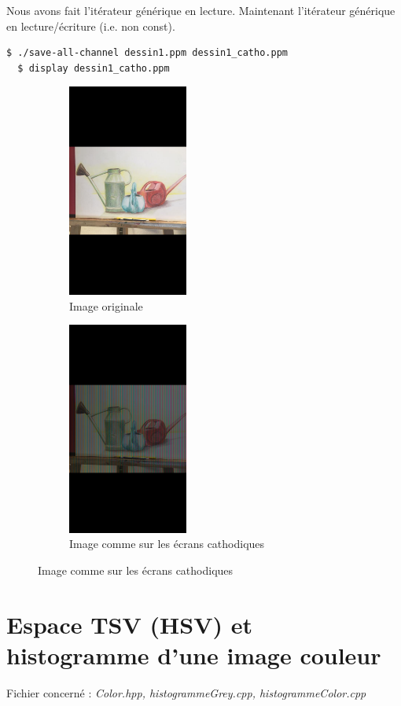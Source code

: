 \documentclass[a4paper,10pt]{article}
\begin{document}
    Nous avons fait l'itérateur générique en lecture. Maintenant l'itérateur générique en lecture/écriture (i.e. non const).
     \begin{lstlisting}[language=Bash]
  $ ./save-all-channel dessin1.ppm dessin1_catho.ppm
  $ display dessin1_catho.ppm
  \end{lstlisting}
   \begin{figure}[h]
   \begin{subfigure}{0.6\textwidth}
    \includegraphics[width=1\linewidth, height=7cm]{dessin1}
    \caption{Image originale}
    \label{fig:dessin1Origin}
    \end{subfigure}
     \begin{subfigure}{0.6\textwidth}
    \includegraphics[width=1\linewidth, height=7cm]{dessin1_catho}   
    \caption{Image comme sur les écrans cathodiques}
    \label{fig:dessin1Catho}
    \end{subfigure}
    \end{figure}
    \pagebreak
    \section{Espace TSV (HSV) et histogramme d'une image couleur}
    Fichier concerné : \emph{Color.hpp, histogrammeGrey.cpp, histogrammeColor.cpp}
\end{document}

